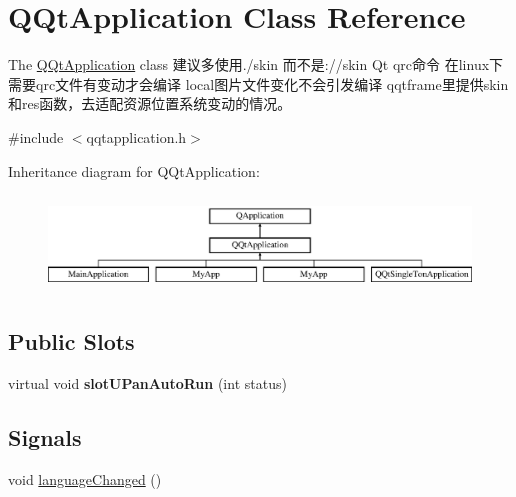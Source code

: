 \hypertarget{class_q_qt_application}{}\section{Q\+Qt\+Application Class Reference}
\label{class_q_qt_application}


The \mbox{\hyperlink{class_q_qt_application}{Q\+Qt\+Application}} class 建议多使用./skin 而不是\+://skin Qt qrc命令 在linux下 需要qrc文件有变动才会编译 local图片文件变化不会引发编译 qqtframe里提供skin和res函数，去适配资源位置系统变动的情况。  




{\ttfamily \#include $<$qqtapplication.\+h$>$}

Inheritance diagram for Q\+Qt\+Application\+:\begin{figure}[H]
\begin{center}
\leavevmode
\includegraphics[height=2.592592cm]{class_q_qt_application}
\end{center}
\end{figure}
\subsection*{Public Slots}
\begin{DoxyCompactItemize}
\item 
\mbox{\label{class_q_qt_application_a4c06f9acc3e99b2819d007191df6f3da}} 
virtual void {\bfseries slot\+U\+Pan\+Auto\+Run} (int status)
\end{DoxyCompactItemize}
\subsection*{Signals}
\begin{DoxyCompactItemize}
\item 
void \mbox{\hyperlink{class_q_qt_application_a3411cfda9ee0ce5f155bd3b40a25eb6f}{language\+Changed}} ()
\end{DoxyCompactItemize}
